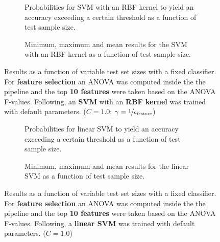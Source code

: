\begin{figure}
    \captionsetup[subfigure]{justification=justified,singlelinecheck=false}
    \begin{subfigure}[t]{0.61\textwidth}
        
        \caption{Probabilities for SVM with an RBF kernel to yield an accuracy exceeding a certain threshold as a function of test sample size.}
    \end{subfigure}
    \hspace{3.0mm}
    \begin{subfigure}[t]{0.34\textwidth}
        
        \caption{Minimum, maximum and mean results for the SVM with an RBF kernel as a function of test sample size.}
    \end{subfigure}
    \caption[Effects of varying test sample size. SVM (kernel = RBF); Preprocessing: ANOVA feature selection ($k_\text{best} = \num{10}$)]{Results as a function of variable test set sizes with a fixed classifier. For \textbf{feature selection} an ANOVA was computed inside the the pipeline and the top \textbf{10 features} were taken based on the ANOVA F-values. Following, an \textbf{{SVM}} with an \textbf{{RBF kernel}} was trained with default parameters. ($C=\num{1.0}$; $\gamma=\sfrac{1}{n_\text{feature}}$)}
    \label{fig:no_PCA_10_best_selected_SVC}
\end{figure}

\begin{figure}
    \captionsetup[subfigure]{justification=justified,singlelinecheck=false}
    \begin{subfigure}[t]{0.61\textwidth}
        
        \caption{Probabilities for linear SVM to yield an accuracy exceeding a certain threshold as a function of test sample size.}
    \end{subfigure}
    \hspace{3.0mm}
    \begin{subfigure}[t]{0.34\textwidth}
        
        \caption{Minimum, maximum and mean results for the linear SVM as a function of test sample size.}
    \end{subfigure}
    \caption[Effects of varying test sample size. Linear SVM; Preprocessing: ANOVA feature selection ($k_\text{best} = \num{10}$)]{Results as a function of variable test set sizes with a fixed classifier. For \textbf{feature selection} an ANOVA was computed inside the the pipeline and the top \textbf{10 features} were taken based on the ANOVA F-values. Following, a \textbf{{linear SVM}} was trained with default parameters. ($C=\num{1.0}$)}
    \label{fig:no_PCA_10_best_selected_LinearSVC}
\end{figure}

